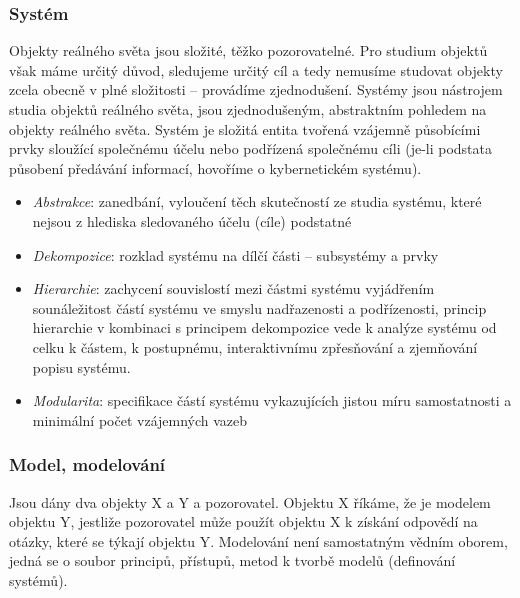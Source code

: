 \subsubsection*{Systém}
Objekty reálného světa jsou složité, těžko pozorovatelné. Pro studium objektů však máme určitý důvod, sledujeme určitý cíl a tedy nemusíme studovat objekty zcela obecně v plné složitosti – provádíme zjednodušení. Systémy jsou nástrojem studia objektů reálného světa, jsou zjednodušeným, abstraktním pohledem na objekty reálného světa. Systém je složitá entita tvořená vzájemně působícími prvky sloužící společnému účelu nebo podřízená společnému cíli (je-li podstata působení předávání informací, hovoříme o kybernetickém systému).
\begin{itemize}
\item \textit{Abstrakce}: zanedbání, vyloučení těch skutečností ze studia systému, které nejsou z hlediska sledovaného účelu (cíle) podstatné
\item \textit{Dekompozice}: rozklad systému na dílčí části – subsystémy a prvky
\item \textit{Hierarchie}: zachycení souvislostí mezi částmi systému vyjádřením sounáležitost částí systému ve smyslu nadřazenosti a podřízenosti, princip hierarchie v kombinaci s principem dekompozice vede k analýze systému od celku k částem, k postupnému, interaktivnímu zpřesňování a zjemňování popisu systému.
\item \textit{Modularita}: specifikace částí systému vykazujících jistou míru samostatnosti a minimální počet vzájemných vazeb
\end{itemize}

\subsubsection*{Model, modelování}
Jsou dány dva objekty X a Y a pozorovatel. Objektu X říkáme, že je modelem objektu Y, jestliže pozorovatel může použít objektu X k získání odpovědí na otázky, které se týkají objektu Y. Modelování není samostatným vědním oborem, jedná se o soubor principů, přístupů, metod k tvorbě modelů (definování systémů).

